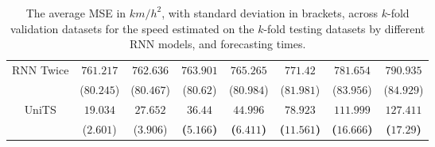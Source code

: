 \begin{table}[!ht]
{\begin{tabular}{|c|c|c|c|c|c|c|c|}
			\multirow{2}{*}{RNN Twice} & $761.217$ & $762.636$ & $763.901$ & $765.265$ & $771.42$ & $781.654$ & $790.935$ \\
			 & ($80.245$) & ($80.467$) & ($80.62$) & ($80.984$) & ($81.981$) & ($83.956$) & ($84.929$) \\ \hline
			\multirow{2}{*}{UniTS} & $19.034$ & $27.652$ & $\mathbf{36.44}$ & $\mathbf{44.996}$ & $\mathbf{78.923}$ & $\mathbf{111.999}$ & $\mathbf{127.411}$ \\
			 & ($2.601$) & ($3.906$) & \textbf{(}$\mathbf{5.166}$\textbf{)} & \textbf{(}$\mathbf{6.411}$\textbf{)} & \textbf{(}$\mathbf{11.561}$\textbf{)} & \textbf{(}$\mathbf{16.666}$\textbf{)} & \textbf{(}$\mathbf{17.29}$\textbf{)} \\ \hline
		\end{tabular}
	}
	\caption{The average MSE in ${km/h}^{2}$, with standard deviation in brackets, across $k$-fold validation datasets for the speed estimated on the $k$-fold testing datasets by different RNN models, and forecasting times.}
	\label{tab:all_speed_MSE}
\end{table}